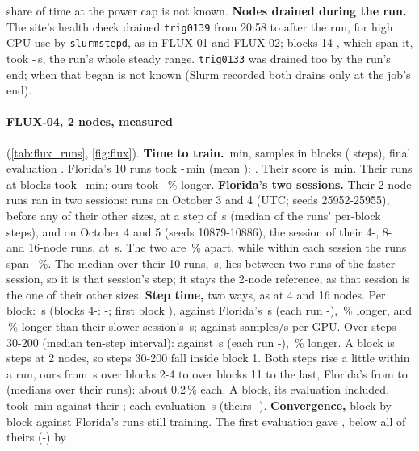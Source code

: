 share of time at the power cap is not known. \textbf{Nodes drained during the run.} The site's health check drained \texttt{trig0139} from 20:58 to after the run, for high CPU use by \texttt{slurmstepd}, as in FLUX-01 and FLUX-02; blocks 14-\TriFxFourBlocks, which span it, took \TriFxFourStepLo-\TriFxFourStepHi\,s, the run's whole steady range. \texttt{trig0133} was drained too by the run's end; when that began is not known (Slurm recorded both drains only at the job's end).

\paragraph{FLUX-04, 2 nodes, measured} (\cref{tab:flux_runs}, \cref{fig:flux}). \textbf{Time to train.} \TriFxTwoTttExact\,min, \TriFxTwoSamples{} samples in \TriFxTwoBlocks{} blocks (\TriFxTwoSteps{} steps), final evaluation \TriFxTwoLastAcc. Florida's 10 runs took \TriFxTwoFlTttLo-\TriFxTwoFlTttHi\,min (mean \TriFxTwoFlTttMean): \TriFxTwoFlBlockCounts. Their score is \TriFxTwoFlTttExact\,min. Their \TriFxTwoFlSameRuns{} runs at \TriFxTwoBlocks{} blocks took \TriFxTwoFlSameLo-\TriFxTwoFlSameHi\,min; ours took \TriFxTwoAboveSameLo-\TriFxTwoAboveSameHi\,\% longer. \textbf{Florida's two sessions.} Their 2-node runs ran in two sessions: \TriFxScaleFlSlowRuns{} runs on October 3 and 4 (UTC; seeds 25952-25955), before any of their other sizes, at a step of \TriFxScaleFlSlow\,s (median of the runs' per-block steps), and \TriFxScaleFlFastRuns{} on October 4 and 5 (seeds 10879-10886), the session of their 4-, 8- and 16-node runs, at \TriFxScaleFlFast\,s. The two are \TriFxScaleFlSessionPct\,\% apart, while within each session the runs span \TriFxScaleFlSessionSpreadLo-\TriFxScaleFlSessionSpreadHi\,\%. The median over their 10 runs, \TriFxTwoFlStep\,s, lies between two runs of the faster session, so it is that session's step; it stays the 2-node reference, as that session is the one of their other sizes. \textbf{Step time,} two ways, as at 4 and 16 nodes. Per block: \TriFxTwoStep\,s (blocks 4-\TriFxTwoBlocks: \TriFxTwoStepLo-\TriFxTwoStepHi; first block \TriFxTwoStepFirst), against Florida's \TriFxTwoFlStep\,s (each run \TriFxTwoFlStepLo-\TriFxTwoFlStepHi), \TriFxTwoStepPct\,\% longer, and \TriFxTwoStepPctSlow\,\% longer than their slower session's \TriFxScaleFlSlow\,s; \TriFxTwoSpsGpu{} against \TriFxTwoFlSpsGpu{} samples/s per GPU. Over steps 30-200 (median ten-step interval): \TriFxTwoTen{} against \TriFxTwoFlTen\,s (each run \TriFxTwoFlTenLo-\TriFxTwoFlTenHi), \TriFxTwoTenPct\,\% longer. A block is \TriFxTwoBlockSteps{} steps at 2 nodes, so steps 30-200 fall inside block 1. Both steps rise a little within a run, ours from \TriFxTwoStepEarly\,s over blocks 2-4 to \TriFxTwoStepLate{} over blocks 11 to the last, Florida's from \TriFxTwoFlStepEarly{} to \TriFxTwoFlStepLate{} (medians over their runs): about 0.2\,\% each. A block, its evaluation included, took \TriFxTwoTpb\,min against their \TriFxTwoFlTpb; each evaluation \TriFxTwoVal\,s (theirs \TriFxTwoFlValLo-\TriFxTwoFlValHi). \textbf{Convergence,} block by block against Florida's runs still training. The first evaluation gave \TriFxTwoFirstAccExact, below all of theirs (\TriFxTwoFlFirstLoExact-\TriFxTwoFlFirstHiExact) by 